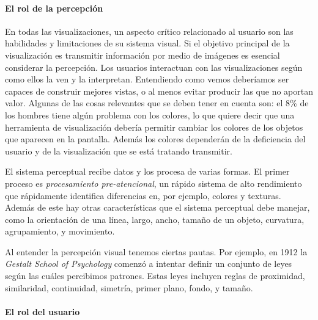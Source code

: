 \documentclass[12pt]{article}
\begin{document}


\paragraph{El rol de la percepción}

En todas las visualizaciones, un aspecto crítico relacionado al usuario son las habilidades y limitaciones de su sistema visual. Si el objetivo principal de la visualización es transmitir información por medio de imágenes es esencial considerar la percepción. Los usuarios interactuan con las visualizaciones según como ellos la ven y la interpretan. Entendiendo como vemos deberíamos ser capaces de construir mejores vistas, o al menos evitar producir las que no aportan valor. Algunas de las cosas relevantes que se deben tener en cuenta son: el 8\% de los hombres tiene algún problema con los colores, lo que quiere decir que una herramienta de visualización debería permitir cambiar los colores de los objetos que aparecen en la pantalla. Además los colores dependerán de la deficiencia del usuario y de la visualización que se está tratando transmitir.


El sistema perceptual recibe datos y los procesa de varias formas. El primer proceso es \textit{procesamiento pre-atencional}, un rápido sistema de alto rendimiento que rápidamente identifica diferencias en, por ejemplo, colores y texturas. Además de este hay otras características que el sistema perceptual debe manejar, como la orientación de una línea, largo, ancho, tamaño de un objeto, curvatura, agrupamiento, y movimiento.

Al entender la percepción visual tenemos ciertas pautas. Por ejemplo, en 1912 la \textit{Gestalt School of Psychology} comenzó a intentar definir un conjunto de leyes según las cuáles percibimos patrones. Estas leyes incluyen reglas de proximidad, similaridad, continuidad, simetría, primer plano, fondo, y tamaño.


\paragraph{El rol del usuario} \hfill \\
\end{document}

